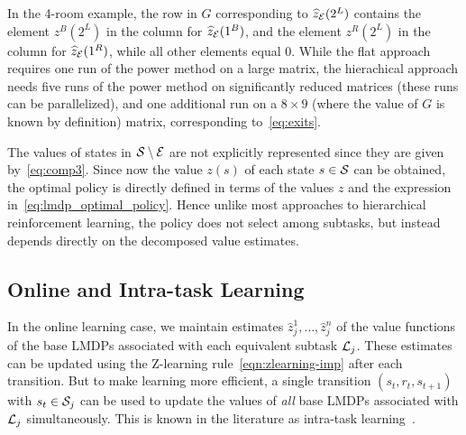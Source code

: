 \begin{example}[Example 1] In the 4-room example, the row in $G$ corresponding to $\widehat{z}_{\mathcal{E}}(2^L)$ contains the element $z^B(2^L)$ in the column for $\widehat{z}_{\mathcal{E}}(1^B)$, and the element $z^R(2^L)$ in the column for $\widehat{z}_{\mathcal{E}}(1^R)$, while all other elements equal $0$. While the flat approach requires one run of the power method on a large matrix, %
the hierachical approach needs five runs of the power method on significantly reduced %
 matrices (these runs can be parallelized), and one additional run on a $8\times 9$ (where the value of $G$ is known by definition) matrix, corresponding to~\eqref{eq:exits}.
\end{example} %

The values of states in $\mathcal{S}\setminus\mathcal{E}$ are not explicitly represented since they are given by~\eqref{eq:comp3}.
Since now the value $z(s)$ of each state $s\in\mathcal{S}$ can be obtained, the optimal policy is directly defined in terms of the values $z$ and the expression in~\eqref{eq:lmdp_optimal_policy}. Hence unlike most approaches to hierarchical reinforcement learning, the policy does not select among subtasks, but instead depends directly on the decomposed value estimates.

\subsection{Online and Intra-task Learning}


In the online learning case, we maintain estimates $\widehat{z}_j^1,\ldots,\widehat{z}_j^n$ of the value functions of the base LMDPs associated with each equivalent subtask $\mathcal{L}_j$. These estimates can be updated using the Z-learning rule~\eqref{eqn:zlearning-imp} after each transition.
But to make learning more efficient, a single transition $(s_t,r_t,s_{t+1})$ with $s_t\in\mathcal{S}_j$ can be used to update the values of {\em all} base LMDPs associated with $\mathcal{L}_j$ simultaneously. This is known in the literature as intra-task learning~\citep{Kaelbling1993,Jonsson2016}.


